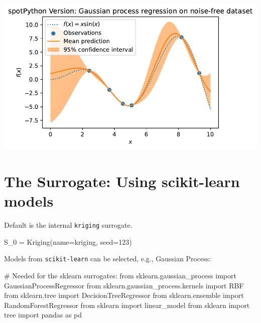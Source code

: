 \documentclass[
  letterpaper,
  DIV=11,
  numbers=noendperiod]{scrreprt}
\newenvironment{Shaded}{\begin{snugshade}}{\end{snugshade}}
\newcommand{\CommentTok}[1]{\textcolor[rgb]{0.37,0.37,0.37}{#1}}
\newcommand{\DecValTok}[1]{\textcolor[rgb]{0.68,0.00,0.00}{#1}}
\newcommand{\ImportTok}[1]{\textcolor[rgb]{0.00,0.46,0.62}{#1}}
\newcommand{\NormalTok}[1]{\textcolor[rgb]{0.00,0.23,0.31}{#1}}
\newcommand{\OperatorTok}[1]{\textcolor[rgb]{0.37,0.37,0.37}{#1}}
\newcommand{\StringTok}[1]{\textcolor[rgb]{0.13,0.47,0.30}{#1}}
\begin{document}
\includegraphics{012_num_spot_ei_files/figure-pdf/cell-25-output-1.pdf}

\section{The Surrogate: Using scikit-learn
models}\label{the-surrogate-using-scikit-learn-models}

Default is the internal \texttt{kriging} surrogate.

\begin{Shaded}
\begin{Highlighting}[]
\NormalTok{S\_0 }\OperatorTok{=}\NormalTok{ Kriging(name}\OperatorTok{=}\StringTok{\textquotesingle{}kriging\textquotesingle{}}\NormalTok{, seed}\OperatorTok{=}\DecValTok{123}\NormalTok{)}
\end{Highlighting}
\end{Shaded}

Models from \texttt{scikit-learn} can be selected, e.g., Gaussian
Process:

\begin{Shaded}
\begin{Highlighting}[]
\CommentTok{\# Needed for the sklearn surrogates:}
\ImportTok{from}\NormalTok{ sklearn.gaussian\_process }\ImportTok{import}\NormalTok{ GaussianProcessRegressor}
\ImportTok{from}\NormalTok{ sklearn.gaussian\_process.kernels }\ImportTok{import}\NormalTok{ RBF}
\ImportTok{from}\NormalTok{ sklearn.tree }\ImportTok{import}\NormalTok{ DecisionTreeRegressor}
\ImportTok{from}\NormalTok{ sklearn.ensemble }\ImportTok{import}\NormalTok{ RandomForestRegressor}
\ImportTok{from}\NormalTok{ sklearn }\ImportTok{import}\NormalTok{ linear\_model}
\ImportTok{from}\NormalTok{ sklearn }\ImportTok{import}\NormalTok{ tree}
\ImportTok{import}\NormalTok{ pandas }\ImportTok{as}\NormalTok{ pd}
\end{Highlighting}
\end{Shaded}
\end{document}
